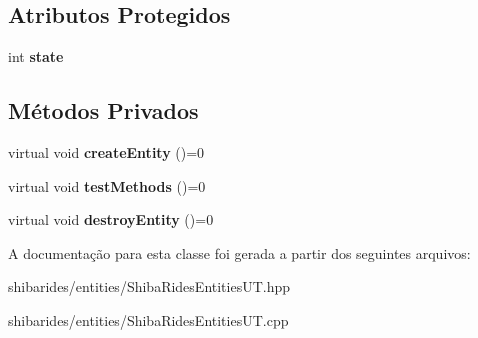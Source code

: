 \subsection*{Atributos Protegidos}
\begin{DoxyCompactItemize}
\item 
int {\bfseries state}\hypertarget{classshibarides_1_1TUEntidade_ae97a7aafba3d0ff02733c49e4471a777}{}\label{classshibarides_1_1TUEntidade_ae97a7aafba3d0ff02733c49e4471a777}

\end{DoxyCompactItemize}
\subsection*{Métodos Privados}
\begin{DoxyCompactItemize}
\item 
virtual void {\bfseries create\+Entity} ()=0\hypertarget{classshibarides_1_1TUEntidade_a240d170e81ddaacf9ebc7735da43d727}{}\label{classshibarides_1_1TUEntidade_a240d170e81ddaacf9ebc7735da43d727}

\item 
virtual void {\bfseries test\+Methods} ()=0\hypertarget{classshibarides_1_1TUEntidade_a6f04c7f529e266a8590a93e8efd53b2f}{}\label{classshibarides_1_1TUEntidade_a6f04c7f529e266a8590a93e8efd53b2f}

\item 
virtual void {\bfseries destroy\+Entity} ()=0\hypertarget{classshibarides_1_1TUEntidade_abc20192c0caa09b83d7f23f21dcf8203}{}\label{classshibarides_1_1TUEntidade_abc20192c0caa09b83d7f23f21dcf8203}

\end{DoxyCompactItemize}


A documentação para esta classe foi gerada a partir dos seguintes arquivos\+:\begin{DoxyCompactItemize}
\item 
shibarides/entities/Shiba\+Rides\+Entities\+U\+T.\+hpp\item 
shibarides/entities/Shiba\+Rides\+Entities\+U\+T.\+cpp\end{DoxyCompactItemize}
